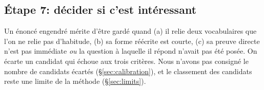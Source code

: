\subsection{Étape 7: décider si c'est intéressant}

Un énoncé engendré mérite d'être gardé quand (a) il relie deux vocabulaires que l'on ne relie pas d'habitude, (b) sa forme réécrite est courte, (c) sa preuve directe n'est pas immédiate \emph{ou} la question à laquelle il répond n'avait pas été posée. On écarte un candidat qui échoue aux trois critères. Nous n'avons pas consigné le nombre de candidats écartés (\S\ref{sec:calibration}), et le classement des candidats reste une limite de la méthode (\S\ref{sec:limits}).
